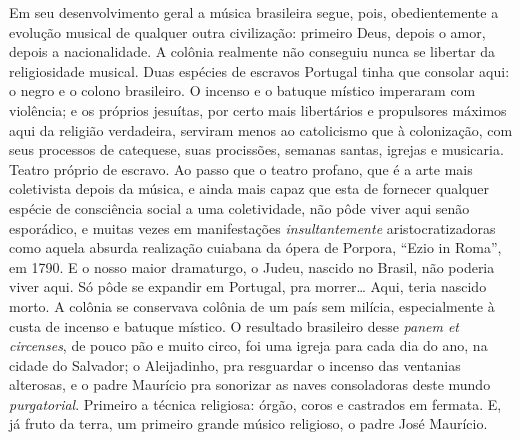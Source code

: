 Em seu desenvolvimento geral a música brasileira segue, pois,
obedientemente a evolução musical de qualquer outra civilização:
primeiro Deus, depois o amor, depois a nacionalidade. A colônia
realmente não conseguiu nunca se libertar da religiosidade musical. Duas
espécies de escravos Portugal tinha que consolar aqui: o negro e o
colono brasileiro. O incenso e o batuque místico imperaram com
violência; e os próprios jesuítas, por certo mais libertários e
propulsores máximos aqui da religião verdadeira, serviram menos ao
catolicismo que à colonização, com seus processos de catequese, suas
procissões, semanas santas, igrejas e musicaria. Teatro próprio de
escravo. Ao passo que o teatro profano, que é a arte mais coletivista
depois da música, e ainda mais capaz que esta de fornecer qualquer
espécie de consciência social a uma coletividade, não pôde viver aqui
senão esporádico, e muitas vezes em manifestações \textit{insultantemente}
aristocratizadoras como aquela absurda realização cuiabana da ópera de
Porpora, ``Ezio in Roma'', em 1790. E o nosso maior dramaturgo, o Judeu,
nascido no Brasil, não poderia viver aqui. Só pôde se expandir em
Portugal, pra morrer\ldots{} Aqui, teria nascido morto. A colônia se
conservava colônia de um país sem milícia, especialmente à custa de
incenso e batuque místico. O resultado brasileiro desse \textit{panem et
circenses}, de pouco pão e muito circo, foi uma igreja para cada dia do
ano, na cidade do Salvador; o Aleijadinho, pra resguardar o incenso das
ventanias alterosas, e o padre Maurício pra sonorizar as naves
consoladoras deste mundo \textit{purgatorial}. Primeiro a técnica religiosa:
órgão, coros e castrados em fermata. E, já fruto da terra, um primeiro
grande músico religioso, o padre José Maurício.

